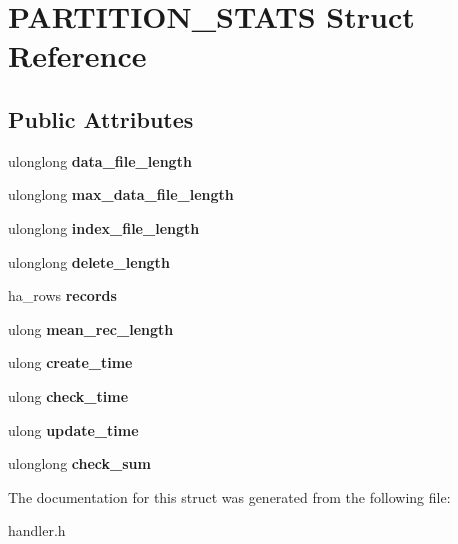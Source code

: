\hypertarget{structPARTITION__STATS}{}\section{P\+A\+R\+T\+I\+T\+I\+O\+N\+\_\+\+S\+T\+A\+TS Struct Reference}
\label{structPARTITION__STATS}
\subsection*{Public Attributes}
\begin{DoxyCompactItemize}
\item 
\mbox{\label{structPARTITION__STATS_a074b6125a818a3a55a49b13781e5a624}} 
ulonglong {\bfseries data\+\_\+file\+\_\+length}
\item 
\mbox{\label{structPARTITION__STATS_a380514d29af2fac1a45e8188d2db3800}} 
ulonglong {\bfseries max\+\_\+data\+\_\+file\+\_\+length}
\item 
\mbox{\label{structPARTITION__STATS_a9fb0d7a7ec884553b58fb77f1f3b696f}} 
ulonglong {\bfseries index\+\_\+file\+\_\+length}
\item 
\mbox{\label{structPARTITION__STATS_a9670b2f382618b35cd19d5d1c2584237}} 
ulonglong {\bfseries delete\+\_\+length}
\item 
\mbox{\label{structPARTITION__STATS_a78ab1ae8287512921262684fc22cadea}} 
ha\+\_\+rows {\bfseries records}
\item 
\mbox{\label{structPARTITION__STATS_a117cda0a2c18277de0a300466280b52c}} 
ulong {\bfseries mean\+\_\+rec\+\_\+length}
\item 
\mbox{\label{structPARTITION__STATS_a287f0dcb4d9cb10d5c9ed19bd8706655}} 
ulong {\bfseries create\+\_\+time}
\item 
\mbox{\label{structPARTITION__STATS_afa5d056e602f4e841181a18d6df2006a}} 
ulong {\bfseries check\+\_\+time}
\item 
\mbox{\label{structPARTITION__STATS_a96309c778f4e82bd60c5a2ab82921283}} 
ulong {\bfseries update\+\_\+time}
\item 
\mbox{\label{structPARTITION__STATS_aeb6dbbfe671311d7ec3e22e1611218fb}} 
ulonglong {\bfseries check\+\_\+sum}
\end{DoxyCompactItemize}


The documentation for this struct was generated from the following file\+:\begin{DoxyCompactItemize}
\item 
handler.\+h\end{DoxyCompactItemize}
